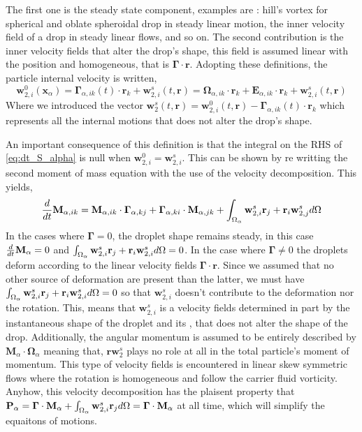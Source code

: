 The first one is the steady state component, examples are : hill's vortex for spherical and oblate spheroidal drop in steady linear motion, the inner velocity field of a drop in steady linear flows, and so on. 
The second contribution is the inner velocity fields that alter the drop's shape, this field is assumed linear with the position and homogeneous, that is $\bm\Gamma\cdot \textbf{r}$. 
Adopting these definitions, the particle internal velocity is written, 
\begin{equation}
    \textbf{w}_{2,i}^0(\textbf{x}_\alpha)
    = \bm\Gamma_{\alpha,ik}(t) \cdot \textbf{r}_k
    + \textbf{w}^{s}_{2,i}(t,\textbf{r})
    =\bm{\Omega}_{\alpha,ik}\cdot \textbf{r}_k
    + \textbf{E}_{\alpha,ik} \cdot \textbf{r}_k
    + \textbf{w}^{s}_{2,i}(t,\textbf{r})
    \label{eq:def_vel}
\end{equation}
Where we introduced the vector $\textbf{w}^{s}_2(t,\textbf{r}) =\textbf{w}^{0}_{2,i}(t,\textbf{r})  - \bm\Gamma_{\alpha,ik}(t) \cdot \textbf{r}_k$ which represents all the internal motions that does not alter the drop's shape. 

An important consequence of this definition is that the integral on the RHS of \ref{eq:dt_S_alpha} is null when $\textbf{w}_{2,i}^0 = \textbf{w}_{2,i}^s$. 
This can be shown by re writting the second moment of mass equation with the use of the velocity decomposition.
This yields,
\begin{equation*}
    \frac{d}{dt} \textbf{M}_{\alpha,ik}
    = 
    \textbf{M}_{\alpha,ik} \cdot \bm\Gamma_{\alpha,kj}
    +  \bm\Gamma_{\alpha,ki} \cdot \textbf{M}_{\alpha,jk}
    +
    \int_{\Omega_{\alpha}}  
        \textbf{w}_{2,i}^s\textbf{r}_j
        + \textbf{r}_i\textbf{w}_{2,j}^s
     d\Omega
\end{equation*}
In the cases where $\bm\Gamma = 0$, the droplet shape remains steady, in this case $\frac{d}{dt} \textbf{M}_\alpha = 0$ and $\int_{\Omega_{\alpha}} \textbf{w}^{s}_{2,i} \textbf{r}_j + \textbf{r}_i \textbf{w}_{2,i}^s d\Omega = 0$. 
In the case where $\bm\Gamma \neq 0$ the droplets deform according to the linear velocity fields $\bm\Gamma\cdot \textbf{r}$.
Since we assumed that no other source of deformation are present than the latter, we must have $\int_{\Omega_{\alpha}} \textbf{w}^{s}_{2,i} \textbf{r}_j + \textbf{r}_i \textbf{w}_{2,i}^s d\Omega = 0$ so that $\textbf{w}^{s}_{2,i} $ doesn't contribute to the deformation nor the rotation.
This, means that $\textbf{w}^{s}_{2,i}$ is a velocity fields determined in  part by the instantaneous shape of the droplet and its , that does not alter the shape of the drop. 
Additionally, the angular momentum is assumed to be entirely described by $\textbf{M}_\alpha \cdot \bm\Omega_\alpha$ meaning that, $\textbf{r} \textbf{w}_{2}^s$ plays no role at all in the total particle's moment of momentum.
This type of velocity fields is encountered in linear skew symmetric flows where the rotation is homogeneous and follow the carrier fluid vorticity. 
Anyhow, this velocity decomposition has the plaisent property that $\textbf{P}_\alpha = \bm\Gamma \cdot \textbf{M}_\alpha + \int_{\Omega_{\alpha}} \textbf{w}^{s}_{2,i} \textbf{r}_j d\Omega =  \bm\Gamma \cdot \textbf{M}_\alpha $ at all time, which will simplify the equaitons of motions. 


